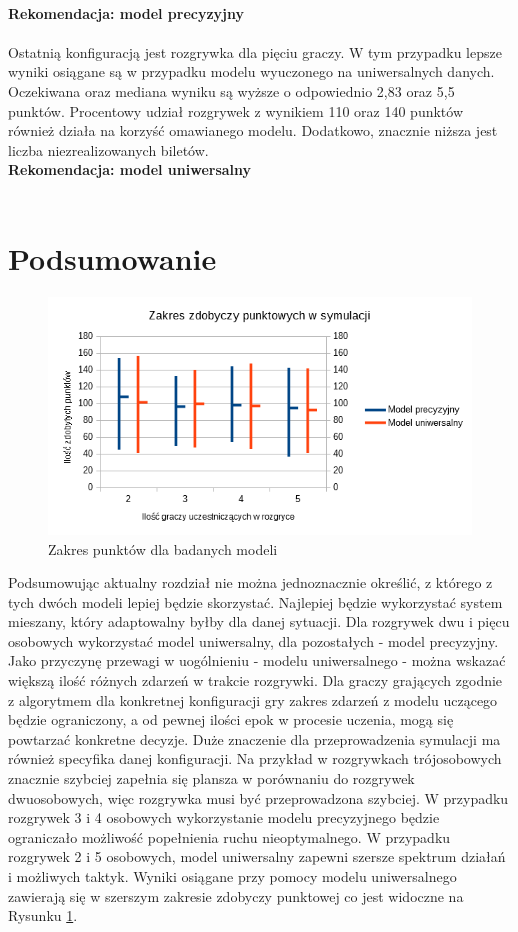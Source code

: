 \documentclass[12pt, oneside]{report}
\begin{document}
\\ \textbf{Rekomendacja: model precyzyjny} \\ \\ 
Ostatnią konfiguracją jest rozgrywka dla pięciu graczy. W tym przypadku lepsze wyniki osiągane są w przypadku modelu wyuczonego na uniwersalnych danych. Oczekiwana oraz mediana wyniku są wyższe o odpowiednio 2,83 oraz 5,5 punktów. Procentowy udział rozgrywek z wynikiem 110 oraz 140 punktów również działa na korzyść omawianego modelu. Dodatkowo, znacznie niższa jest liczba niezrealizowanych biletów. \\ \textbf{Rekomendacja: model uniwersalny} \\ \\
\section{Podsumowanie}
\begin{figure}[h]
	\includegraphics{ZakresPunktow.png}
	\caption{Zakres punktów dla badanych modeli}
	\label{figure:points_range}
\end{figure}
Podsumowując aktualny rozdział nie można jednoznacznie określić, z którego z tych dwóch modeli lepiej będzie skorzystać. Najlepiej będzie wykorzystać system mieszany, który adaptowalny byłby dla danej sytuacji. Dla rozgrywek dwu i pięcu osobowych wykorzystać model uniwersalny, dla pozostałych - model precyzyjny. Jako przyczynę przewagi w uogólnieniu - modelu uniwersalnego - można wskazać większą ilość różnych zdarzeń w trakcie rozgrywki. Dla graczy grających zgodnie z algorytmem dla konkretnej konfiguracji gry zakres zdarzeń z modelu uczącego będzie ograniczony, a od pewnej ilości epok w procesie uczenia, mogą się powtarzać konkretne decyzje. Duże znaczenie dla przeprowadzenia symulacji ma również specyfika danej konfiguracji. Na przykład w rozgrywkach trójosobowych znacznie szybciej zapełnia się plansza w porównaniu do rozgrywek dwuosobowych, więc rozgrywka musi być przeprowadzona szybciej. W przypadku rozgrywek 3 i 4 osobowych wykorzystanie modelu precyzyjnego będzie ograniczało możliwość popełnienia ruchu nieoptymalnego. W przypadku rozgrywek 2 i 5 osobowych, model uniwersalny zapewni szersze spektrum działań i możliwych taktyk. Wyniki osiągane przy pomocy modelu uniwersalnego zawierają się w szerszym zakresie zdobyczy punktowej co jest widoczne na Rysunku \ref{figure:points_range}.
\end{document}
